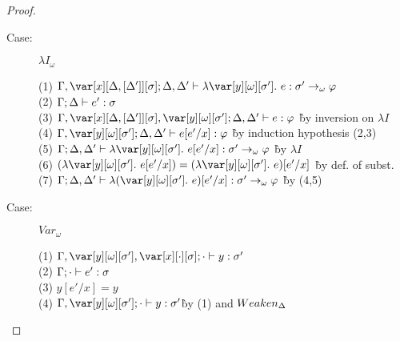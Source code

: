 \begin{proof}
\begin{description}
\item[Case:] $\lambda I_\omega$
\begin{tabbing}
    (1) $\G, \xD; \D, \D' \vdash \lambda \y[\omega][\s'].~e : \s' \to_\omega \vp$\\
    (2) $\Gamma; \Delta \vdash e' : \sigma$\\
    (3) $\G, \xD, \y[\omega][\s']; \D, \D' \vdash e : \vp$ \` by inversion on $\lambda I$\\
    (4) $\G, \y[\omega][\s']; \D, \D' \vdash e[e'/x] : \vp$ \` by induction hypothesis (2,3)\\
    (5) $\G; \D, \D' \vdash \lambda \y[\omega][\s'].~e[e'/x] : \s' \to_\omega \vp$ \` by $\lambda I$\\
    (6) $(\lambda \y[\omega][\s'].~e[e'/x]) = (\lambda \y[\omega][\s'].~e)[e'/x]$ \` by def. of subst.\\
    (7) $\G; \D, \D' \vdash \lambda (\y[\omega][\s'].~e)[e'/x] : \s' \to_\omega \vp$ \` by (4,5)\\
\end{tabbing}

%
%
\item[Case:] $Var_\omega$
\begin{tabbing}
    (1) $\G, \yo, \x[\cdot][\s]; \cdot \vdash y : \s'$\\
    (2) $\Gamma; \cdot \vdash e' : \sigma$\\
    (3) $y[e'/x] = y$\\
    (4) $\G,\yo;\cdot \vdash y : \s'$\` by (1) and $Weaken_\Delta$\\
\end{tabbing}


\end{description}
\end{proof}
